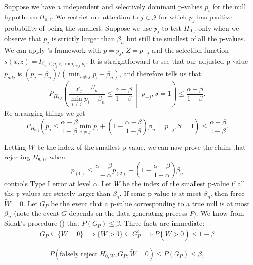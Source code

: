\documentclass{article}
\begin{document}
\begin{appendix}
Suppose we have $n$ independent and selectively dominant p-values $p_i$ for the null hypotheses $H_{0, i}$. We restrict our attention to $j \in \mathcal{J}$ for which $p_j$ has positive probability of being the smallest. Suppose we use $p_j$ to test $H_{0, j}$ only when we observe that $p_j$ is strictly larger than $\beta_n$ but still the smallest of all the p-values. We can apply 's framework with $p=p_j$, $Z = p_{-j}$ and the selection function $s(x, z) = I_{\beta_n < p_j < \min_{i \neq j} p_i}$. It is straightforward to see that our adjusted p-value $p_{adj}$ is $(p_j - \beta_n)/(\min_{i \neq j} p_i - \beta_n)$, and  therefore tells us that 
\begin{equation*}
    P_{H_{0, j}}\left( \frac{p_j - \beta_n}{\min_{i \neq j} p_i - \beta_n} \leq \frac{\alpha -\beta}{1-\beta}  \;\middle|\; p_{-j}, S=1 \right) \leq \frac{\alpha - \beta}{1-\beta}.
\end{equation*}
Re-arranging things we get 
\begin{equation}
    \label{eq:hybrid_tool}
    P_{H_{0, j}}\left( p_j  \leq \frac{\alpha -\beta}{1-\beta}\min_{i \neq j} p_i  + \left( 1 - \frac{\alpha -\beta}{1-\beta}\right) \beta_n  \;\middle|\; p_{-j}, S=1  \right) \leq \frac{\alpha - \beta}{1-\beta}.
\end{equation}


Letting $W$ be the index of the smallest p-value, we can now prove the claim that rejecting $H_{0, W}$ when 
\begin{equation*}
    p_{(1)} \leq \frac{\alpha-\beta}{1-\alpha} p_{(2)} + \left(1 - \frac{\alpha-\beta}{1-\alpha} \right) \beta_n 
\end{equation*}
controls Type I error at level $\alpha$. Let $\widetilde{W}$ be the index of the smallest p-value if all the p-values are strictly larger than $\beta_n$. If some p-value is at most $\beta_n$, then force $\widetilde{W}=0$. Let $G_P$ be the event that a p-value corresponding to a true null is at most $\beta_n$ (note the event $G$ depends on the data generating process $P$). We know from Sidak's procedure () that $P(G_P) \leq \beta$. Three facts are immediate: 
\begin{equation*}
    G_P \subseteq \{\widetilde{W} = 0 \} \implies \{\widetilde{W} > 0 \} \subseteq G_P^c \implies P(\widetilde{W} > 0) \leq 1-\beta 
\end{equation*}

\begin{equation*}
    P(\text{falsely reject } H_{0, W}, G_P, \widetilde{W} = 0) \leq P(G_P) \leq \beta,
\end{equation*}


\end{appendix}
\end{document}
